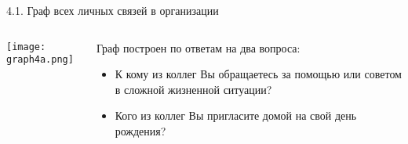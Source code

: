 \begin{frame}{4.1. Граф всех личных связей в организации}

\begin{columns}[T] 
\begin{column}{0.8\textwidth} 
\centering
          \texttt{[image: graph4a.png]}
\end{column}
\begin{column}{0.2\textwidth} 
\tiny
Граф построен по ответам на два вопроса:
\begin{itemize}
\item К кому из коллег Вы обращаетесь за помощью или советом в сложной жизненной ситуации?
\item Кого из коллег Вы пригласите домой на свой день рождения?
\end{itemize}
\end{column}
\end{columns}
\end{frame}


